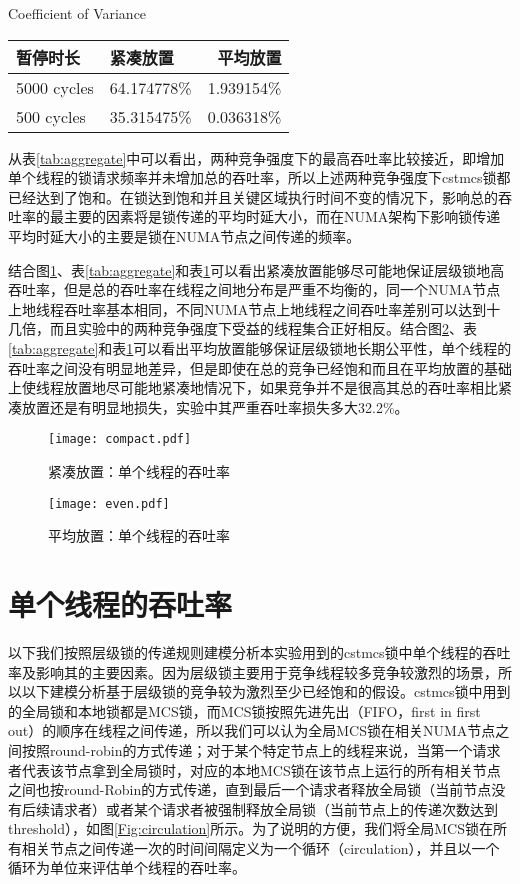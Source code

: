 \begin{table}[!hpb]
  \centering
    {Coefficient of Variance}
  \label{tab:CV}
  \begin{tabular}{@{}llr@{}} \toprule
    暂停时长 & 紧凑放置 & 平均放置\\ \midrule
    5000 cycles & 64.174778\% & 1.939154\%\\
    500  cycles & 35.315475\% & 0.036318\%\\
  \end{tabular}
\end{table}

从表\ref{tab:aggregate}中可以看出，两种竞争强度下的最高吞吐率比较接近，即增加单个线程的锁请求频率并未增加总的吞吐率，所以上述两种竞争强度下cstmcs锁都已经达到了饱和。在锁达到饱和并且关键区域执行时间不变的情况下，影响总的吞吐率的最主要的因素将是锁传递的平均时延大小，而在NUMA架构下影响锁传递平均时延大小的主要是锁在NUMA节点之间传递的频率。

结合图\ref{Fig:compact}、表\ref{tab:aggregate}和表\ref{tab:CV}可以看出紧凑放置能够尽可能地保证层级锁地高吞吐率，但是总的吞吐率在线程之间地分布是严重不均衡的，同一个NUMA节点上地线程吞吐率基本相同，不同NUMA节点上地线程之间吞吐率差别可以达到十几倍，而且实验中的两种竞争强度下受益的线程集合正好相反。结合图\ref{Fig:even}、表\ref{tab:aggregate}和表\ref{tab:CV}可以看出平均放置能够保证层级锁地长期公平性，单个线程的吞吐率之间没有明显地差异，但是即使在总的竞争已经饱和而且在平均放置的基础上使线程放置地尽可能地紧凑地情况下，如果竞争并不是很高其总的吞吐率相比紧凑放置还是有明显地损失，实验中其严重吞吐率损失多大32.2\%。

\begin{figure}[t]
	\centering
	\texttt{[image: compact.pdf]}
	\caption{紧凑放置：单个线程的吞吐率}
	\label{Fig:compact}
\end{figure}

\begin{figure}[t]
	\centering
	\texttt{[image: even.pdf]}
	\caption{平均放置：单个线程的吞吐率}
	\label{Fig:even}
\end{figure}

\section{单个线程的吞吐率}
以下我们按照层级锁的传递规则建模分析本实验用到的cstmcs锁中单个线程的吞吐率及影响其的主要因素。因为层级锁主要用于竞争线程较多竞争较激烈的场景，所以以下建模分析基于层级锁的竞争较为激烈至少已经饱和的假设。cstmcs锁中用到的全局锁和本地锁都是MCS锁，而MCS锁按照先进先出（FIFO，first in first out）的顺序在线程之间传递，所以我们可以认为全局MCS锁在相关NUMA节点之间按照round-robin的方式传递；对于某个特定节点上的线程来说，当第一个请求者代表该节点拿到全局锁时，对应的本地MCS锁在该节点上运行的所有相关节点之间也按round-Robin的方式传递，直到最后一个请求者释放全局锁（当前节点没有后续请求者）或者某个请求者被强制释放全局锁（当前节点上的传递次数达到threshold），如图\ref{Fig:circulation}所示。为了说明的方便，我们将全局MCS锁在所有相关节点之间传递一次的时间间隔定义为一个循环（circulation），并且以一个循环为单位来评估单个线程的吞吐率。

